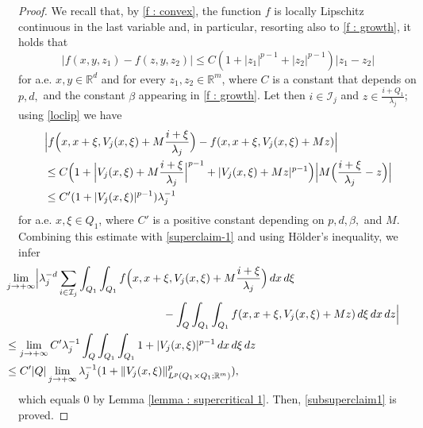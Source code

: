 \documentclass{article}
\theoremstyle{definition}
\newcommand{\R}{\mathbb{R}}
\begin{document}
\begin{proof}
We recall that, by \eqref{f : convex}, the function $f$ is locally Lipschitz continuous in the last variable and, in particular, resorting also to \eqref{f : growth}, it holds that
\begin{equation}\label{loclip}
    |f(x,y,z_1)-f(z,y,z_2)|\leq C(1+|z_1|^{p-1}+|z_2|^{p-1})|z_1-z_2|
\end{equation}
for a.e.\! $x,y\in\R^d$ and for every $z_1,z_2\in \R^m$, where $C$ is a constant that depends on $p,d,$ and the constant $\beta$ appearing in \eqref{f : growth}. Let then $i\in \mathcal{I}_j$ and $z\in \frac{i+Q_1}{\lambda_j}$; using \eqref{loclip} we have
\begin{align*}
    &   \Bigl|f\Bigl(x,x+\xi,V_j(x,\xi) + M\frac{i+\xi}{\lambda_j}\Bigr)-f(x,x+\xi,V_j(x,\xi)+Mz)\Bigr| \\
    & \leq C\Bigl(1+\Bigl|V_j(x,\xi)+ M\frac{i+\xi}{\lambda_j}\Bigr|^{p-1}+|V_j(x,\xi)+Mz|^{p-1}\Bigr)\Bigl|M\Bigl(\frac{i+\xi}{\lambda_j}-z\Bigr)\Bigr| \\
    &\leq C'(1+|V_j(x,\xi)|^{p-1})\lambda_j^{-1}
\end{align*}
for a.e.\! $x,\xi\in Q_1$, where $C'$ is a positive constant depending on $p,d,\beta,$ and $M$. Combining this estimate with \eqref{superclaim-1} and using H\"older's inequality, we infer
\begin{align*}
    & \hspace{-1cm} \lim_{j\to+\infty } \Bigl|\lambda_j^{-d} \sum_{i\in \mathcal{I}_j}\int_{Q_1} \int_{Q_1} f\Bigl(x,x+\xi,V_j(x,\xi) + M\frac{i+\xi}{\lambda_j}\Bigr)\, dx\,d\xi \\ \notag
    & \hspace{4cm} -\int_Q \int_{Q_1} \int_{Q_1} f(x,x+\xi,V_j(x,\xi)+Mz)\, d\xi\,dx \, dz \Bigr| \\ \notag
    & \hspace{-1cm} \leq \lim_{j\to+\infty}C'\lambda_j^{-1}\int_Q\int_{Q_1}\int_{Q_1} 1+|V_j(x,\xi)|^{p-1}\, dx\,d\xi\,dz \\
    & \hspace{-1cm} \leq C'|Q|\lim_{j\to+\infty}\lambda_j^{-1}(1+\|V_j(x,\xi)\|^p_{L^p(Q_1\times Q_1;\R^m)}),
\end{align*}
which equals $0$ by Lemma \ref{lemma : supercritical 1}. Then, \eqref{subsuperclaim1} is proved.


\end{proof}
\end{document}

